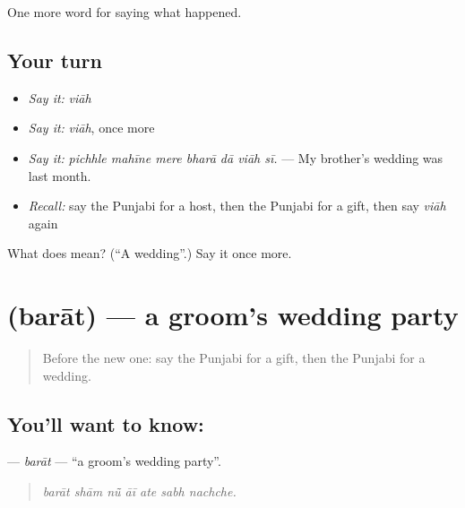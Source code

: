\begin{grammarlens}[title={What you've built}]
One more word for saying what happened.
\end{grammarlens}

\subsection*{Your turn}
\begin{itemize}
\raggedright
  \item \emph{Say it:} \emph{viāh}
  \item \emph{Say it:} \emph{viāh}, once more
  \item \emph{Say it:} \emph{pichhle mahīne mere bharā dā viāh sī.} — My brother's wedding was last month.
  \item \emph{Recall:} say the Punjabi for a host, then the Punjabi for a gift, then say \emph{viāh} again
\end{itemize}

\begin{tcolorbox}[breakable,colback=teal!4,colframe=teal!35!black,title={Before you move on}]
What does  mean? (\textquotedblleft{}A wedding\textquotedblright{}.) Say it once more.
\end{tcolorbox}
\section[\texorpdfstring{\pa{ਬਰਾਤ} (barāt)}{ਬਰਾਤ (barāt)}]{ (barāt) — a groom's wedding party}

\label{lesson:PA-C313-barat}



\begin{quote}
Before the new one: say the Punjabi for a gift, then the Punjabi for a wedding.
\end{quote}

\subsection*{You'll want to know: }
\textbf{} — \emph{barāt} — \textquotedblleft{}a groom's wedding party\textquotedblright{}.

\begin{quote}
      
\end{quote}

\begin{quote}
\emph{barāt shām nū̃ āī ate sabh nachche.}
\end{quote}


